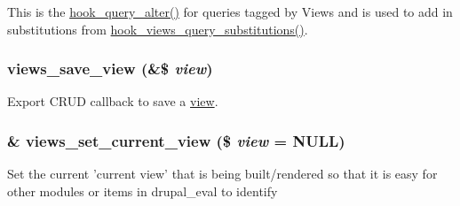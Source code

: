 This is the \hyperlink{group__hooks_gaf166f6375e9f7b5919d719eb91198d47}{hook\_\-query\_\-alter()} for queries tagged by Views and is used to add in substitutions from \hyperlink{group__views__hooks_gac3628ab1f08eee5a2bd9c3c4b5bd4c3b}{hook\_\-views\_\-query\_\-substitutions()}. \hypertarget{views_8module_a7de4aba561f47e86e405f5519a0d3dfe}{
\subsubsection[{views\_\-save\_\-view}]{\setlength{\rightskip}{0pt plus 5cm}views\_\-save\_\-view (\&\$ {\em view})}}
\label{views_8module_a7de4aba561f47e86e405f5519a0d3dfe}
Export CRUD callback to save a \hyperlink{classview}{view}. \hypertarget{views_8module_af6970f0a92406ed61373aa9ede6b121e}{
\subsubsection[{views\_\-set\_\-current\_\-view}]{\setlength{\rightskip}{0pt plus 5cm}\& views\_\-set\_\-current\_\-view (\$ {\em view} = {\ttfamily NULL})}}
\label{views_8module_af6970f0a92406ed61373aa9ede6b121e}
Set the current 'current view' that is being built/rendered so that it is easy for other modules or items in drupal\_\-eval to identify

